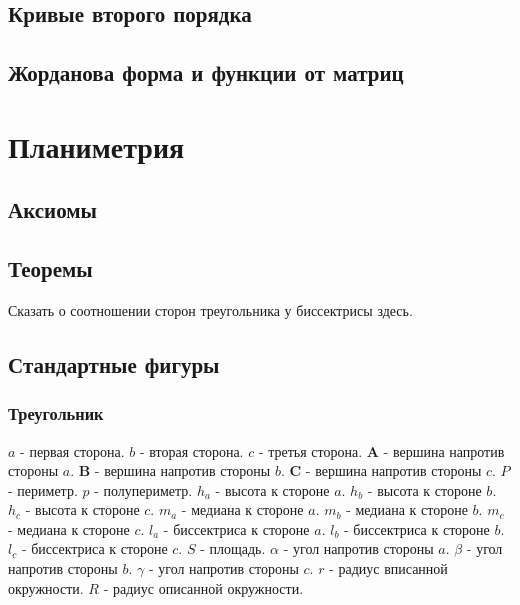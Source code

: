 \subsection{Кривые второго порядка}

\subsection{Жорданова форма и функции от матриц}


\section{Планиметрия}

\subsection{Аксиомы}

\subsection{Теоремы}

Сказать о соотношении сторон треугольника у биссектрисы здесь.

\subsection{Стандартные фигуры}

\subsubsection{Треугольник}

$a$ - первая сторона.
$b$ - вторая сторона.
$c$ - третья сторона.
$\boldsymbol{A}$ - вершина напротив стороны $a$.
$\boldsymbol{B}$ - вершина напротив стороны $b$.
$\boldsymbol{C}$ - вершина напротив стороны $c$.
$P$ - периметр.
$p$ - полупериметр.
$h_a$ - высота к стороне $a$.
$h_b$ - высота к стороне $b$.
$h_c$ - высота к стороне $c$.
$m_a$ - медиана к стороне $a$.
$m_b$ - медиана к стороне $b$.
$m_c$ - медиана к стороне $c$.
$l_a$ - биссектриса к стороне $a$.
$l_b$ - биссектриса к стороне $b$.
$l_c$ - биссектриса к стороне $c$.
$S$ - площадь.
$\alpha$ - угол напротив стороны $a$.
$\beta$ - угол напротив стороны $b$.
$\gamma$ - угол напротив стороны $c$.
$r$ - радиус вписанной окружности.
$R$ - радиус описанной окружности.

